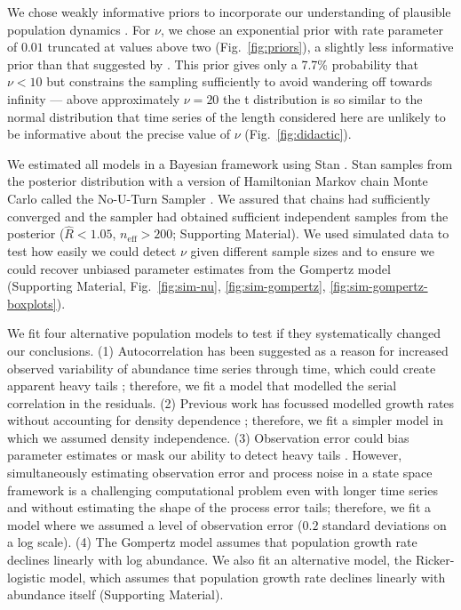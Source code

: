 We chose weakly informative priors to incorporate our understanding of plausible population dynamics \citep[Supporting Material]{gelman2014}. For $\nu$, we chose an exponential prior with rate parameter of $0.01$ truncated at values above two (Fig.~\ref{fig:priors}), a slightly less informative prior than that suggested by \citet{fernandez1998}. This prior gives only a 7.7\% probability that $\nu < 10$ but constrains the sampling sufficiently to avoid wandering off towards infinity --- above approximately $\nu = 20$ the t distribution is so similar to the normal distribution that time series of the length considered here are unlikely to be informative about the precise value of $\nu$ (Fig.~\ref{fig:didactic}).

We estimated all models in a Bayesian framework using Stan \citep{stan-manual2014}. Stan samples from the posterior distribution with a version of Hamiltonian Markov chain Monte Carlo called the No-U-Turn Sampler \citep{hoffman2014}. We assured that chains had sufficiently converged and the sampler had obtained sufficient independent samples from the posterior ($\widehat{R} < 1.05$, $n_\mathrm{eff} > 200$; Supporting Material). We used simulated data to test how easily we could detect $\nu$ given different sample sizes and to ensure we could recover unbiased parameter estimates from the Gompertz model (Supporting Material, Fig.~\ref{fig:sim-nu}, \ref{fig:sim-gompertz}, \ref{fig:sim-gompertz-boxplots}).

We fit four alternative population models to test if they systematically changed our conclusions. (1) Autocorrelation has been suggested as a reason for increased observed variability of abundance time series through time, which could create apparent heavy tails \citep{inchausti2002}; therefore, we fit a model that modelled the serial correlation in the residuals. (2) Previous work has focussed modelled growth rates without accounting for density dependence \citep{segura2013}; therefore, we fit a simpler model in which we assumed density independence. (3) Observation error could bias parameter estimates \citep{knape2012} or mask our ability to detect heavy tails \citep{ward2007}. However, simultaneously estimating observation error and process noise in a state space framework is a challenging computational problem \citep[e.g.][]{dennis2006, knape2008} even with longer time series and without estimating the shape of the process error tails; therefore, we fit a model where we assumed a level of observation error ($0.2$ standard deviations on a log scale). (4) The Gompertz model assumes that population growth rate declines linearly with log abundance. We also fit an alternative model, the Ricker-logistic model, which assumes that population growth rate declines linearly with abundance itself (Supporting Material).

